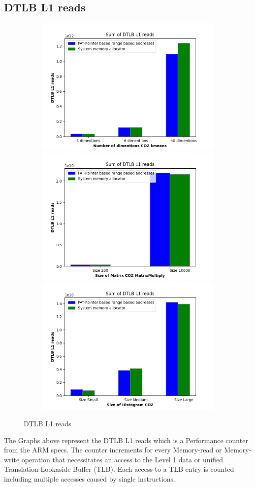 \subsection{DTLB L1 reads}
\begin{figure}
  \begin{subfigure}{\linewidth}
  \includegraphics[width=.5\linewidth]{l1-tlb-kmeans.png}\hfill
  \includegraphics[width=.5\linewidth]{l1-tlb-matrixmultiply.png}\hfill
  \includegraphics[width=.5\linewidth]{l1-tlb-histogram.png}
\end{subfigure}
\caption{DTLB L1 reads}
\label{fig:TLBl1}
\end{figure}
The Graphs above represent the DTLB L1 reads which is a Performance counter from the ARM specs. 
The counter increments for every Memory-read or Memory-write operation that necessitates an 
access to the Level 1 data or unified Translation Lookaside Buffer (TLB). 
Each access to a TLB entry is counted including multiple accesses caused by single instructions.

